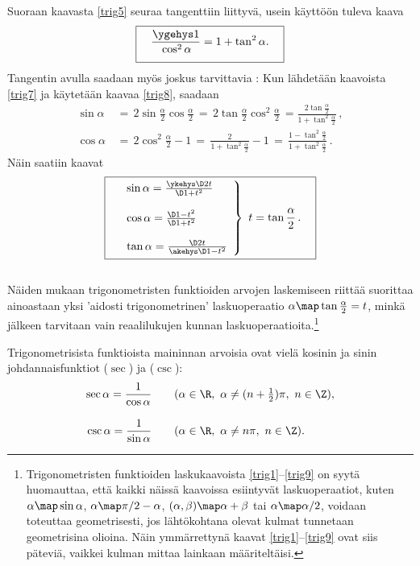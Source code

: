 Suoraan kaavasta \eqref{trig5} seuraa tangenttiin liittyvä, usein käyttöön tuleva kaava
\begin{equation} \label{trig8}
\boxed{\quad \frac{\ygehys 1}{\rule[-2mm]{0mm}{2mm} \cos^2 \alpha} = 1 + \tan^2 \alpha. \quad }
\end{equation}
Tangentin avulla saadaan myös joskus tarvittavia : Kun lähdetään
kaavoista \eqref{trig7} ja käytetään kaavaa \eqref{trig8}, saadaan
\begin{align*}
\sin \alpha &\,=\,2 \sin \frac{\alpha}{2} \cos \frac{\alpha}{2}
             \,=\, 2 \tan \frac{\alpha}{2} \cos^2 \frac{\alpha}{2}
             \,= \frac{2\tan \frac{\alpha}{2}}{1 + \tan^2 \frac{\alpha}{2}}\,, \\
\cos \alpha &\,=\,2\cos^2 \frac{\alpha}{2} - 1
             \,=\,\frac{2}{1+\tan^2 \frac{\alpha}{2}} - 1 
             \,=\,\frac{1 - \tan^2 \frac{\alpha}{2}}{1 + \tan^2 \frac{\alpha}{2}}\,.
\end{align*}
Näin saatiin kaavat \\
\begin{equation} \label{trig9}
\boxed{\quad\left.\begin{array}{ll}
\sin\alpha = \frac{\ykehys \D 2t}{\D 1+t^2} \\ \\
\cos\alpha = \frac{\D 1-t^2}{\D 1+t^2} \\ \\
\tan\alpha = \frac{\D 2t}{\akehys \D 1-t^2}
\end{array}\right\} \ t= \tan \frac{\alpha}{2}\,. \quad}
\end{equation} \\
Näiden mukaan trigonometristen funktioiden arvojen laskemiseen riittää suorittaa ainoastaan yksi
'aidosti trigonometrinen' laskuoperaatio $\alpha \map \tan \frac{\alpha}{2} = t$, minkä jälkeen
tarvitaan vain reaalilukujen kunnan laskuoperaatioita.\footnote[2]{Trigonometristen funktioiden
laskukaavoista \eqref{trig1}--\eqref{trig9} on syytä huomauttaa, että kaikki näissä kaavoissa
esiintyvät laskuoperaatiot, kuten $\alpha\map\sin\alpha$, $\alpha\map\pi/2-\alpha$,
$(\alpha,\beta)\map\alpha+\beta$ tai $\alpha\map\alpha/2$, voidaan toteuttaa geometrisesti, jos
lähtökohtana olevat kulmat tunnetaan geometrisina olioina. Näin ymmärrettynä kaavat 
\eqref{trig1}--\eqref{trig9} ovat siis päteviä, vaikkei kulman mittaa lainkaan määriteltäisi.}

Trigonometrisista funktioista maininnan arvoisia ovat vielä kosinin ja sinin johdannaisfunktiot
 ($\sec$) ja  ($\csc$):
\begin{align*}
\sec \alpha = \frac{1}{\cos \alpha} \qquad 
                     &(\alpha \in \R, \ \alpha \neq (n + \tfrac{1}{2}) \pi, \ n \in \Z), \\[3mm]
\csc \alpha = \frac{1}{\sin \alpha} \qquad 
                     &(\alpha \in \R, \ \alpha \neq n \pi, \ n \in \Z).
\end{align*}


